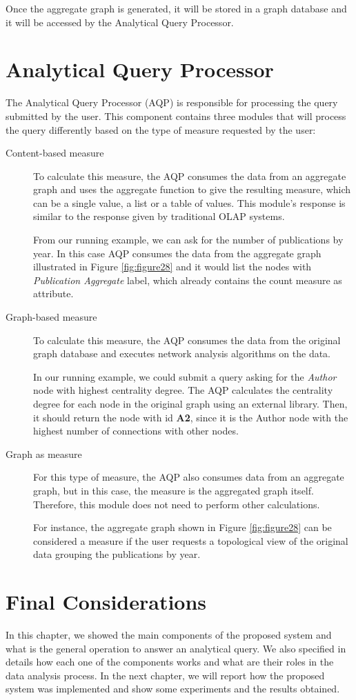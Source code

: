 Once the aggregate graph is generated, it will be stored in a graph database and it will be accessed by the Analytical Query Processor.

\section{Analytical Query Processor}

The Analytical Query Processor (AQP) is responsible for processing the query submitted by the user. This component contains three modules that will process the query differently based on the type of measure requested by the user:
\begin{description}
\item[Content-based measure] To calculate this measure, the AQP consumes the data from an aggregate graph and uses the aggregate function to give the resulting measure, which can be a single value, a list or a table of values. This module's response is similar to the response given by traditional OLAP systems.

From our running example, we can ask for the number of publications by year. In this case AQP consumes the data from the aggregate graph illustrated in Figure \ref{fig:figure28} and it would list the nodes with \emph{Publication Aggregate} label, which already contains the count measure as attribute.

\item[Graph-based measure] To calculate this measure, the AQP consumes the data from the original graph database and executes network analysis algorithms on the data. 

In our running example, we could submit a query asking for the \emph{Author} node with highest centrality degree. The AQP calculates the centrality degree for each node in the original graph using an external library. Then, it should return the node with id \textbf{A2}, since it is the Author node with the highest number of connections with other nodes.

\item[Graph as measure] For this type of measure, the AQP also consumes data from an aggregate graph, but in this case, the measure is the aggregated graph itself. Therefore, this module does not need to perform other calculations.

For instance, the aggregate graph shown in Figure \ref{fig:figure28} can be considered a measure if the user requests a topological view of the original data grouping the publications by year.
\end{description}

\section{Final Considerations}
In this chapter, we showed the main components of the proposed system and what is the general operation to answer an analytical query. We also specified in details how each one of the components works and what are their roles in the data analysis process. In the next chapter, we will report how the proposed system was implemented and show some experiments and the results obtained.